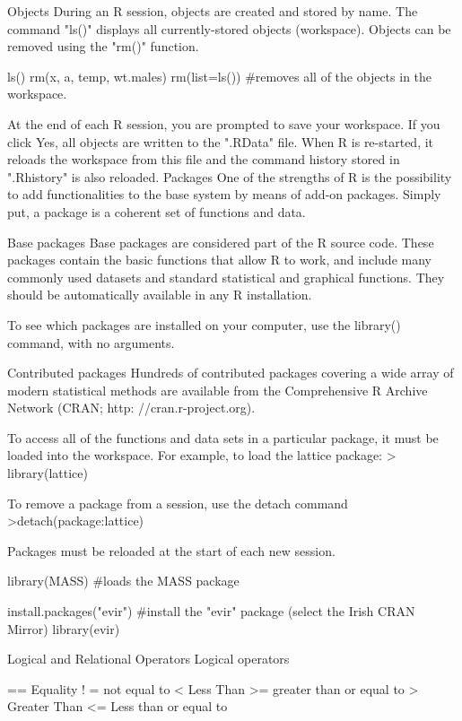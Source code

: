 Objects
During an R session, objects are created and stored by name. The command "ls()" displays all currently-stored objects (workspace). Objects can be removed using the "rm()" function.



ls()
rm(x, a, temp, wt.males)
rm(list=ls())								#removes all of the objects in the workspace.


At the end of each R session, you are prompted to save your workspace. If you click Yes, all objects are written to the ".RData" file. 
When R is re-started, it reloads the workspace from this file and the command history stored in ".Rhistory" is also reloaded.
Packages
One of the strengths of R is the possibility to add functionalities to the base system by means of add-on packages. Simply put, a package is a coherent set of functions and
data.
 


Base packages
Base packages are considered part of the R source code. These packages contain the basic functions that allow R to work, and include many commonly used datasets and standard statistical and graphical functions. They should be automatically available in any R installation.


To see which packages are installed on your computer, use the library() command, with no arguments.

Contributed packages
Hundreds of contributed packages covering a wide array of modern statistical methods are available from the Comprehensive R Archive Network (CRAN; http: //cran.r-project.org).

To access all of the functions and data sets in a particular package, it must be loaded into the workspace. 
For example, to load the lattice package:
> library(lattice)

To remove a package from a session, use the detach command
>detach(package:lattice)

Packages must be reloaded at the start of each new session.


library(MASS)							  #loads the MASS package

install.packages("evir")			#install the "evir" package (select the Irish CRAN Mirror)
library(evir)

Logical and Relational Operators
Logical operators

 ==
Equality
 ! = 
 not equal to
 < 
Less Than
 >=
 greater than or equal to
>
Greater Than
 <=
 Less than or equal to
 



